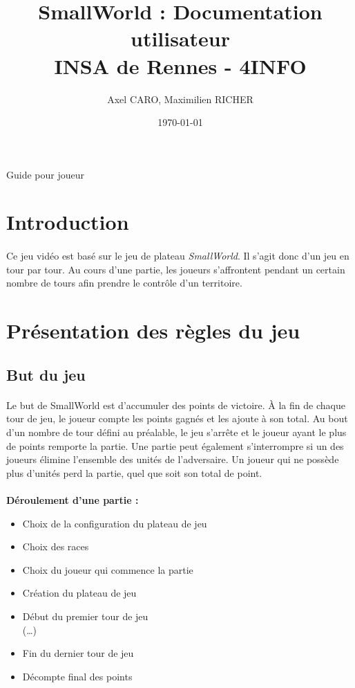 \documentclass[a4paper]{article}
\title{SmallWorld : Documentation utilisateur \\ INSA de Rennes - 4INFO}
\author{Axel CARO, Maximilien RICHER}
\date{\today}
\begin{document}
\maketitle

\paragraph{}
Guide pour joueur
\\
\tableofcontents

\newpage

\section*{Introduction}
\paragraph{}
Ce jeu vidéo est basé sur le jeu de plateau \textit{SmallWorld}. Il s'agit donc d'un jeu en tour par tour.
Au cours d'une partie, les joueurs s'affrontent pendant un certain nombre de tours afin prendre le contrôle d'un territoire.

\section{Présentation des règles du jeu}

\subsection{But du jeu}
\paragraph{}
Le but de SmallWorld est d'accumuler des points de victoire.
À la fin de chaque tour de jeu, le joueur compte les points gagnés et les ajoute à son total. Au bout d'un nombre de tour défini au préalable, le jeu s'arrête et le joueur ayant le plus de points remporte la partie. Une partie peut également s'interrompre si un des joueurs élimine l'ensemble des unités de l'adversaire. Un joueur qui ne possède plus d'unités perd la partie, quel que soit son total de point.

\paragraph{}
\textbf{Déroulement d'une partie : }
\begin{itemize}
    \item Choix de la configuration du plateau de jeu
    \item Choix des races
    \item Choix du joueur qui commence la partie
    \item Création du plateau de jeu
    \item Début du premier tour de jeu\\(\dots)
    \item Fin du dernier tour de jeu
    \item Décompte final des points
\end{itemize}
\end{document}
